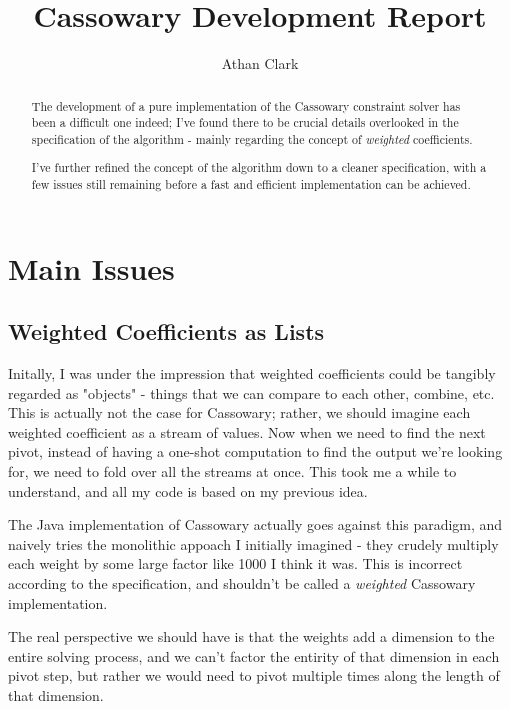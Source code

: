 \documentclass{article}
\begin{document}
\title{Cassowary Development Report}
\author{Athan Clark}

\maketitle

\begin{abstract}
  The development of a pure implementation of the Cassowary constraint solver
  has been a difficult one indeed; I've found there to be crucial details
  overlooked in the specification of the algorithm - mainly regarding the
  concept of \textit{weighted} coefficients.

  I've further refined the concept of the algorithm down to a cleaner specification,
  with a few issues still remaining before a fast and efficient implementation
  can be achieved.
\end{abstract}

\section*{Main Issues}

\subsection*{Weighted Coefficients as Lists}

Initally, I was under the impression that weighted coefficients could be
tangibly regarded as "objects" - things that we can compare to each other,
combine, etc. This is actually not the case for Cassowary; rather, we should
imagine each weighted coefficient as a stream of values. Now when we need
to find the next pivot, instead of having a one-shot computation to find
the output we're looking for, we need to fold over all the streams at once.
This took me a while to understand, and all my code is based on my previous idea.

The Java implementation of Cassowary actually goes against this paradigm, and
naively tries the monolithic appoach I initially imagined - they crudely
multiply each weight by some large factor like 1000 I think it was. This is
incorrect according to the specification, and shouldn't be called a \textit{weighted}
Cassowary implementation.

The real perspective we should have is that the weights add a dimension to the
entire solving process, and we can't factor the entirity of that dimension in
each pivot step, but rather we would need to pivot multiple times along the
length of that dimension.
\end{document}
